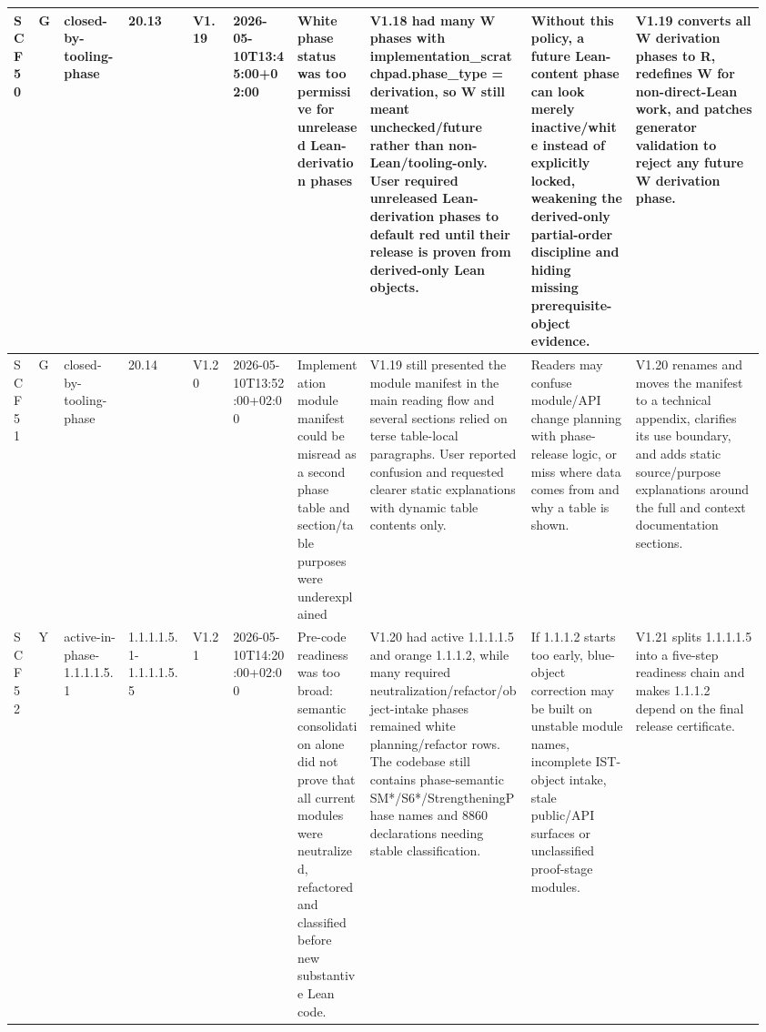 \begin{longtable}{L{0.03\linewidth} L{0.026\linewidth} L{0.087\linewidth} L{0.085\linewidth} L{0.052\linewidth} L{0.085\linewidth} L{0.095\linewidth} L{0.205\linewidth} L{0.13\linewidth} L{0.165\linewidth}}
\hline
\addlinespace[0.24em]
SCF50 & G & closed-by-tooling-phase & 20.13 & V1.19 & 2026-05-10T13:45:00+02:00 & White phase status was too permissive for unreleased Lean-derivation phases & V1.18 had many W phases with implementation\_scratchpad.phase\_type = derivation, so W still meant unchecked/\allowbreak{}future rather than non-Lean/\allowbreak{}tooling-only. User required unreleased Lean-derivation phases to default red until their release is proven from derived-only Lean objects. & Without this policy, a future Lean-content phase can look merely inactive/\allowbreak{}white instead of explicitly locked, weakening the derived-only partial-order discipline and hiding missing prerequisite-object evidence. & V1.19 converts all W derivation phases to R, redefines W for non-direct-Lean work, and patches generator validation to reject any future W derivation phase.\\
\hline
\addlinespace[0.24em]
SCF51 & G & closed-by-tooling-phase & 20.14 & V1.20 & 2026-05-10T13:52:00+02:00 & Implementation module manifest could be misread as a second phase table and section/\allowbreak{}table purposes were underexplained & V1.19 still presented the module manifest in the main reading flow and several sections relied on terse table-local paragraphs. User reported confusion and requested clearer static explanations with dynamic table contents only. & Readers may confuse module/\allowbreak{}API change planning with phase-release logic, or miss where data comes from and why a table is shown. & V1.20 renames and moves the manifest to a technical appendix, clarifies its use boundary, and adds static source/\allowbreak{}purpose explanations around the full and context documentation sections.\\
\hline
\addlinespace[0.24em]
SCF52 & Y & active-in-phase-1.1.1.1.5.1 & 1.1.1.1.5.1-1.1.1.1.5.5 & V1.21 & 2026-05-10T14:20:00+02:00 & Pre-code readiness was too broad: semantic consolidation alone did not prove that all current modules were neutralized, refactored and classified before new substantive Lean code. & V1.20 had active 1.1.1.1.5 and orange 1.1.1.2, while many required neutralization/\allowbreak{}refactor/\allowbreak{}object-intake phases remained white planning/\allowbreak{}refactor rows. The codebase still contains phase-semantic SM*/\allowbreak{}S6*/\allowbreak{}StrengtheningPhase names and 8860 declarations needing stable classification. & If 1.1.1.2 starts too early, blue-object correction may be built on unstable module names, incomplete IST-object intake, stale public/\allowbreak{}API surfaces or unclassified proof-stage modules. & V1.21 splits 1.1.1.1.5 into a five-step readiness chain and makes 1.1.1.2 depend on the final release certificate.\\

\end{longtable}
